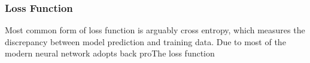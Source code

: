\subsubsection{Loss Function}

Most common form of loss function is arguably cross entropy, which measures the discrepancy between model prediction and training data. Due to most of the modern neural network adopts back proThe loss function 